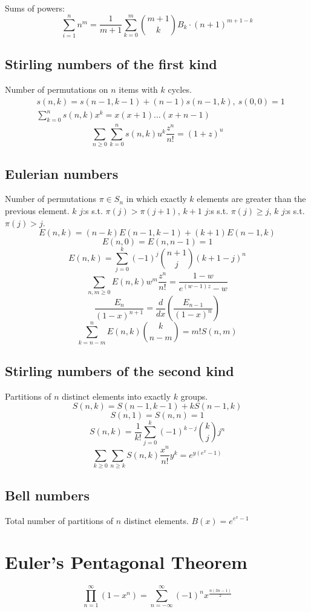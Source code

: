 		Sums of powers:
		\small
		\[ \sum_{i=1}^n n^m = \frac{1}{m+1} \sum_{k=0}^m \binom{m+1}{k} B_k \cdot (n+1)^{m+1-k} \]
		\normalsize


	\subsection{Stirling numbers of the first kind}
		Number of permutations on $n$ items with $k$ cycles.
		\begin{align*}
			&s(n,k) = s(n-1,k-1) + (n-1) s(n-1,k),\ s(0,0) = 1 \\
			&\textstyle \sum_{k=0}^n s(n,k)x^k = x(x+1) \dots (x+n-1)
		\end{align*}
		$$\sum_{n \geqslant 0} \sum_{k=0}^n s(n, k)u^k \frac{z^n}{n!}=(1+z)^u$$

	\subsection{Eulerian numbers}
		Number of permutations $\pi \in S_n$ in which exactly $k$ elements are greater than the previous element. $k$ $j$:s s.t. $\pi(j)>\pi(j+1)$, $k+1$ $j$:s s.t. $\pi(j)\geq j$, $k$ $j$:s s.t. $\pi(j)>j$.
		$$E(n,k) = (n-k)E(n-1,k-1) + (k+1)E(n-1,k)$$
		$$E(n,0) = E(n,n-1) = 1$$
		$$E(n,k) = \sum_{j=0}^k(-1)^j\binom{n+1}{j}(k+1-j)^n$$
		$$\sum_{n, m \geqslant 0} E(n, k) w^m \frac{z^n}{n!}=\frac{1-w}{e^{(w - 1)z}-w}$$
		$$\frac{E_n}{(1-x)^{n+1}}=\frac{d}{dx} \left ( \frac{E_{n-1}}{(1-x)^n} \right )$$
		$$\sum_{k=n-m}^n E(n, k) \binom{k}{n-m}=m!S(n, m)$$

	\subsection{Stirling numbers of the second kind}
		Partitions of $n$ distinct elements into exactly $k$ groups.
		$$S(n,k) = S(n-1,k-1) + k S(n-1,k)$$
		$$S(n,1) = S(n,n) = 1$$
		$$S(n,k) = \frac{1}{k!}\sum_{j=0}^k (-1)^{k-j}\binom{k}{j}j^n$$
		$$\sum_{k \geqslant 0} \sum_{n \geqslant k} S(n, k)\frac{x^n}{n!} y^k=e^{y(e^x-1)}$$

	\subsection{Bell numbers}
		Total number of partitions of $n$ distinct elements. $B(x)=e^{e^x-1}$


\section{Euler's Pentagonal Theorem}
	$$\prod_{n = 1}^{\infty} (1-x^n) = \sum_{n=-\infty}^{\infty} (-1)^n x^{\frac{n(3n-1)}{2}}$$

